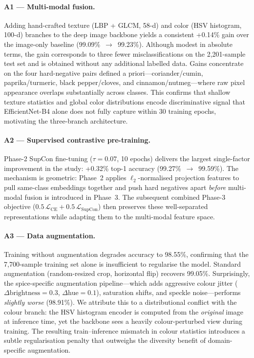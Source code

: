 \documentclass[conference]{IEEEtran}
\begin{document}
\paragraph{A1 — Multi-modal fusion.}
Adding hand-crafted texture (LBP + GLCM, 58-d) and color (HSV histogram,
100-d) branches to the deep image backbone yields a consistent +0.14\%
gain over the image-only baseline (99.09\%~$\to$~99.23\%).  Although modest
in absolute terms, the gain corresponds to three fewer misclassifications on
the 2{,}201-sample test set and is obtained without any additional labelled
data.  Gains concentrate on the four hard-negative pairs defined a
priori—coriander/cumin, paprika/turmeric, black pepper/cloves, and
cinnamon/nutmeg—where raw pixel appearance overlaps substantially across
classes.  This confirms that shallow texture statistics and global color
distributions encode discriminative signal that EfficientNet-B4 alone does
not fully capture within 30 training epochs, motivating the three-branch
architecture.

\paragraph{A2 — Supervised contrastive pre-training.}
Phase-2 SupCon fine-tuning ($\tau = 0.07$, 10 epochs) delivers the
largest single-factor improvement in the study: +0.32\% top-1 accuracy
(99.27\%~$\to$~99.59\%).  The mechanism is geometric: Phase~2 applies
$\ell_2$-normalised projection features to pull same-class embeddings
together and push hard negatives apart \emph{before} multi-modal fusion is
introduced in Phase~3.  The subsequent combined Phase-3 objective
($0.5\,\mathcal{L}_{\text{CE}} + 0.5\,\mathcal{L}_{\text{SupCon}}$)
then preserves these well-separated representations while adapting them to
the multi-modal feature space.

\paragraph{A3 — Data augmentation.}
Training without augmentation degrades accuracy to 98.55\%, confirming
that the 7{,}700-sample training set alone is insufficient to regularise
the model.  Standard augmentation (random-resized crop, horizontal flip)
recovers 99.05\%.  Surprisingly, the spice-specific augmentation
pipeline—which adds aggressive colour jitter ($\Delta\text{brightness}=0.3$,
$\Delta\text{hue}=0.1$), saturation shifts, and speckle noise—performs
\emph{slightly worse} (98.91\%).  We attribute this to a distributional
conflict with the colour branch: the HSV histogram encoder is computed
from the \emph{original} image at inference time, yet the backbone sees
a heavily colour-perturbed view during training.  The resulting
train–inference mismatch in colour statistics introduces a subtle
regularisation penalty that outweighs the diversity benefit of
domain-specific augmentation.
\end{document}
